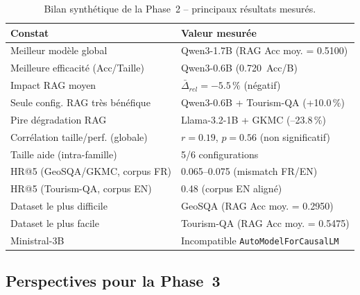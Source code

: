 \documentclass[12pt,a4paper]{article}
\begin{document}
\begin{table}[H]
\centering
\caption{Bilan synth\'etique de la Phase~2 -- principaux r\'esultats mesur\'es.}
\label{tab:bilan_phase2}
\begin{tabularx}{\textwidth}{@{} l X @{}}
\toprule
\textbf{Constat} & \textbf{Valeur mesur\'ee} \\
\midrule
Meilleur mod\`ele global & Qwen3-1.7B (RAG Acc moy. = 0.5100) \\
\rowcolor{lightgray}
Meilleure efficacit\'e (Acc/Taille) & Qwen3-0.6B (0.720~Acc/B) \\
Impact RAG moyen & $\bar{\Delta}_{rel} = -5.5\,\%$ (n\'egatif) \\
\rowcolor{lightgray}
Seule config. RAG tr\`es b\'en\'efique & Qwen3-0.6B + Tourism-QA (+10.0\,\%) \\
Pire d\'egradation RAG & Llama-3.2-1B + GKMC (--23.8\,\%) \\
\rowcolor{lightgray}
Corr\'elation taille/perf. (globale) & $r = 0.19$, $p = 0.56$ (non significatif) \\
Taille aide (intra-famille) & 5/6 configurations \\
\rowcolor{lightgray}
HR@5 (GeoSQA/GKMC, corpus FR) & 0.065--0.075 (mismatch FR/EN) \\
HR@5 (Tourism-QA, corpus EN) & 0.48 (corpus EN align\'e) \\
\rowcolor{lightgray}
Dataset le plus difficile & GeoSQA (RAG Acc moy. = 0.2950) \\
Dataset le plus facile & Tourism-QA (RAG Acc moy. = 0.5475) \\
\rowcolor{lightgray}
Ministral-3B & Incompatible \texttt{AutoModelForCausalLM} \\
\bottomrule
\end{tabularx}
\end{table}

\subsection{Perspectives pour la Phase~3}
\end{document}
